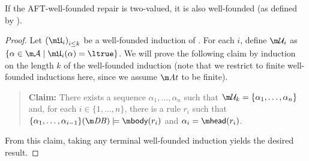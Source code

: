 \begin{proposition}\label{prop:wf-wf}
 If the AFT-well-founded repair is two-valued,  it is also well-founded (as defined by \citet{tase/Cruz-FilipeGEN13}). 
\end{proposition}
\begin{proof}
Let $\left(\UUU_i\right)_{i\leq k}$ be a well-founded induction of \Ap. 
For each $i$, define $\UU_i$ as $\{\alpha \in \acts \mid \UUU_i(\alpha)=\ltrue\}$. 
We will prove the following claim by induction on the length $k$ of the well-founded induction (note that we restrict to finite well-founded inductions here, since we assume $\atoms$ to be finite). 

\begin{quote}\textbf{Claim:} There exists a sequence $\alpha_1,\dots,\alpha_n$ such that $\UU_k=\{\alpha_1,\dots,\alpha_n\}$ and, for each $i\in\{1,\dots,n\}$, there is a rule $r_i$ such that $\{\alpha_1,\dots,\alpha_{i-1}\}(\db) \models \body (r_i)$ and $\alpha_i = \head(r_i)$.\end{quote}

From this claim, taking any terminal well-founded induction yields the desired result. 


\end{proof}

